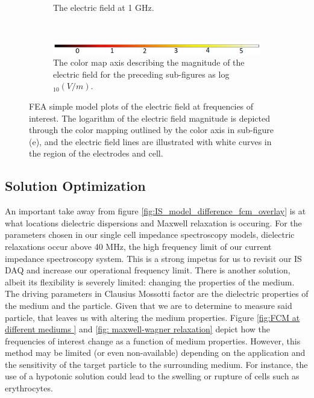 \begin{figure}[h]
\begin{subfigure}[b]{\textwidth}
        \caption{The electric field at 1 GHz.}
    \end{subfigure}
        \\
    \vspace{0.1 in}
    \begin{subfigure}[b]{\textwidth}
        \centering
        \includegraphics[width=\textwidth]{images/simpleCellColorMapAxis.png}
        \caption{The color map axis describing the magnitude of the electric field for the preceding sub-figures as log$_{10}(V/m)$.}
    \end{subfigure}
    \caption[FEA simple model electric field surface plot.]{FEA simple model plots of the electric field at frequencies of interest. The logarithm of the electric field magnitude is depicted through the color mapping outlined by the color axis in sub-figure (e), and the electric field lines are illustrated with white curves in the region of the electrodes and cell.}
    \label{fig:single_cell_model_EZ_plots}
\end{figure}


\FloatBarrier

\subsection{Solution Optimization}
\label{sec:solution_optimization}

\par An important take away from figure \ref{fig:IS_model_difference_fcm_overlay} is at what locations dielectric dispersions and Maxwell relaxation is occuring. For the parameters chosen in our single cell impedance spectroscopy models, dielectric relaxations occur above 40 MHz, the high frequency limit of our current impedance spectroscopy system. This is a strong impetus for us to revisit our IS DAQ and increase our operational frequency limit. There is another solution, albeit its flexibility is severely limited: changing the properties of the medium. The driving parameters in Clausius Mossotti factor are the dielectric properties of the medium and the particle. Given that we are to determine to measure said particle, that leaves us with altering the medium properties. Figure \ref{fig:FCM at different mediums } and \ref{fig: maxwell-wagner relaxation} depict how the frequencies of interest change as a function of medium properties. However, this method may be limited (or even non-available) depending on the application and the sensitivity of the target particle to the surrounding medium. For instance, the use of a hypotonic solution could lead to the swelling or rupture of cells such as erythrocytes.

